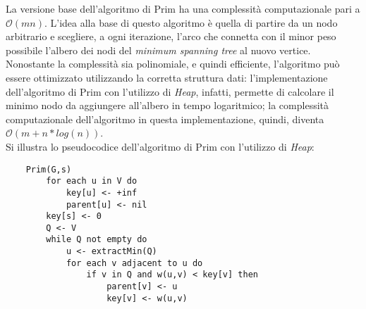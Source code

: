 La versione base dell'algoritmo di Prim ha una complessità computazionale
pari a $\mathcal{O}(mn)$. L'idea alla base di questo algoritmo è quella di partire da un
nodo arbitrario e scegliere, a ogni iterazione, l'arco che connetta con il minor peso possibile
l'albero dei nodi del \textit{minimum spanning tree} al nuovo vertice. \\
Nonostante la complessità sia polinomiale, e quindi efficiente, l'algoritmo può essere ottimizzato
utilizzando la corretta struttura dati: l'implementazione dell'algoritmo di Prim con l'utilizzo di
\textit{Heap}, infatti, permette di calcolare il minimo nodo da aggiungere all'albero in tempo logaritmico;
la complessità computazionale dell'algoritmo in questa implementazione, quindi, diventa \newline $\mathcal{O}(m+n*log(n))$. \\
Si illustra lo pseudocodice dell'algoritmo di Prim con l'utilizzo di \textit{Heap}:
\newpage
\begin{verbatim}
    Prim(G,s)
        for each u in V do
            key[u] <- +inf
            parent[u] <- nil
        key[s] <- 0
        Q <- V
        while Q not empty do
            u <- extractMin(Q)
            for each v adjacent to u do
                if v in Q and w(u,v) < key[v] then
                    parent[v] <- u
                    key[v] <- w(u,v)
\end{verbatim}

